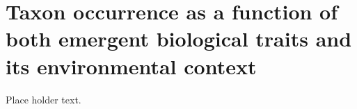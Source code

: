 \chapter{Taxon occurrence as a function of both emergent biological traits and its environmental context}

Place holder text.
